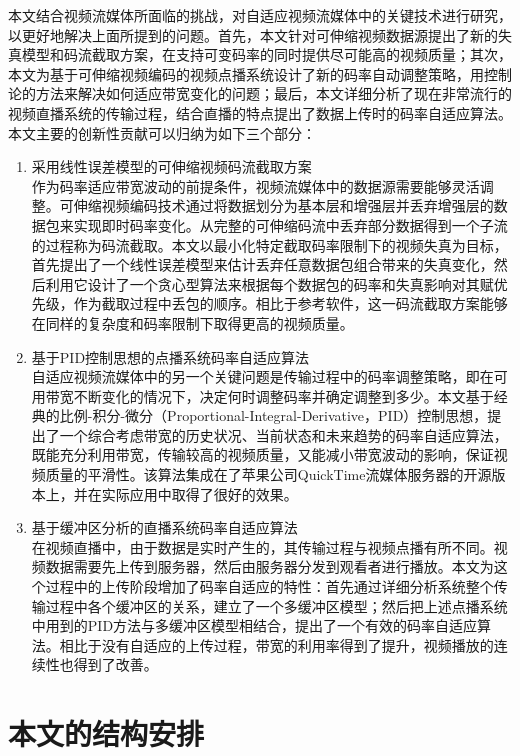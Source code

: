 本文结合视频流媒体所面临的挑战，对自适应视频流媒体中的关键技术进行研究，以更好地解决上面所提到的问题。首先，本文针对可伸缩视频数据源提出了新的失真模型和码流截取方案，在支持可变码率的同时提供尽可能高的视频质量；其次，本文为基于可伸缩视频编码的视频点播系统设计了新的码率自动调整策略，用控制论的方法来解决如何适应带宽变化的问题；最后，本文详细分析了现在非常流行的视频直播系统的传输过程，结合直播的特点提出了数据上传时的码率自适应算法。本文主要的创新性贡献可以归纳为如下三个部分：
\begin{enumerate}
\item {采用线性误差模型的可伸缩视频码流截取方案}\\
作为码率适应带宽波动的前提条件，视频流媒体中的数据源需要能够灵活调整。可伸缩视频编码技术通过将数据划分为基本层和增强层并丢弃增强层的数据包来实现即时码率变化。从完整的可伸缩码流中丢弃部分数据得到一个子流的过程称为码流截取。本文以最小化特定截取码率限制下的视频失真为目标，首先提出了一个线性误差模型来估计丢弃任意数据包组合带来的失真变化，然后利用它设计了一个贪心型算法来根据每个数据包的码率和失真影响对其赋优先级，作为截取过程中丢包的顺序。相比于参考软件，这一码流截取方案能够在同样的复杂度和码率限制下取得更高的视频质量。
\vspace{10pt}
\item {基于PID控制思想的点播系统码率自适应算法}\\
自适应视频流媒体中的另一个关键问题是传输过程中的码率调整策略，即在可用带宽不断变化的情况下，决定何时调整码率并确定调整到多少。本文基于经典的比例-积分-微分（Proportional-Integral-Derivative，PID）控制思想，提出了一个综合考虑带宽的历史状况、当前状态和未来趋势的码率自适应算法，既能充分利用带宽，传输较高的视频质量，又能减小带宽波动的影响，保证视频质量的平滑性。该算法集成在了苹果公司QuickTime流媒体服务器的开源版本上，并在实际应用中取得了很好的效果。
\vspace{10pt}
\item {基于缓冲区分析的直播系统码率自适应算法}\\
在视频直播中，由于数据是实时产生的，其传输过程与视频点播有所不同。视频数据需要先上传到服务器，然后由服务器分发到观看者进行播放。本文为这个过程中的上传阶段增加了码率自适应的特性：首先通过详细分析系统整个传输过程中各个缓冲区的关系，建立了一个多缓冲区模型；然后把上述点播系统中用到的PID方法与多缓冲区模型相结合，提出了一个有效的码率自适应算法。相比于没有自适应的上传过程，带宽的利用率得到了提升，视频播放的连续性也得到了改善。
\end{enumerate}

\section{本文的结构安排}

